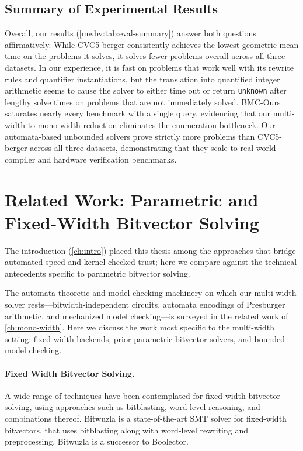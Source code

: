 \subsection{Summary of Experimental Results}

Overall, our results (\cref{mwbv:tab:eval-summary}) answer both questions affirmatively.
While CVC5-berger consistently achieves the lowest geometric mean time on the problems it solves,
it solves fewer problems overall across all three datasets.
In our experience, it is fast on problems that work well with its rewrite rules and quantifier instantiations,
but the translation into quantified integer arithmetic seems to cause the solver to either time out or return \texttt{unknown} after lengthy solve times
on problems that are not immediately solved.
BMC-Ours saturates nearly every benchmark with a single \qfbv{} query,
evidencing that our multi-width to mono-width reduction eliminates the enumeration bottleneck.
Our automata-based unbounded solvers prove strictly more problems than CVC5-berger across all three datasets,
demonstrating that they scale to real-world compiler and hardware verification benchmarks.



\section{Related Work: Parametric and Fixed-Width Bitvector Solving}
\label{sec:multi:related}

The introduction (\cref{ch:intro}) placed this thesis among the approaches that bridge
automated speed and kernel-checked trust; here we compare against the technical
antecedents specific to parametric bitvector solving.

The automata-theoretic and model-checking machinery on which our multi-width
solver rests---bitwidth-independent circuits, automata encodings of Presburger
arithmetic, and mechanized model checking---is surveyed in the related work of
\cref{ch:mono-width}. Here we discuss the work most specific to the multi-width
setting: fixed-width backends, prior parametric-bitvector solvers, and bounded
model checking.

\paragraph{Fixed Width Bitvector Solving.}
A wide range of techniques have been contemplated for fixed-width bitvector solving,
using approaches such as bitblasting, word-level reasoning, and combinations thereof.
Bitwuzla \cite{niemetz2023bitwuzla} is a state-of-the-art SMT solver for fixed-width bitvectors, that uses bitblasting
along with word-level rewriting and preprocessing. Bitwuzla is a successor to Boolector\cite{brummayer2009boolector}.

